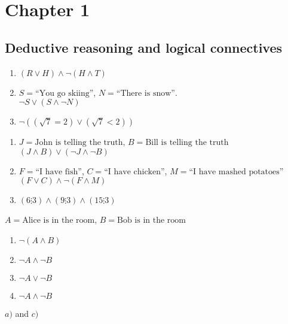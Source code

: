 \section{Chapter 1}
\subsection{Deductive reasoning and logical connectives}
\begin{exx}
  \begin{enumerate}[label=(\alph*)]
    \item $(R\lor H) \land \lnot(H \land T)$
    \item $S = \text{``You go skiing''}$, $N = \text{``There is snow''}$.\\
    $\lnot S \lor (S \land \lnot N)$
    \item $\lnot((\sqrt{7}=2)\lor (\sqrt{7}<2))$
  \end{enumerate}
\end{exx}

\begin{exx}
  \begin{enumerate}[label=(\alph*)]
    \item $J=\text{John is telling the truth}$, $B=\text{Bill is telling the truth}$ \\
    $(J\land B)\lor (\lnot J \land \lnot B)$
    \item $F=\text{``I have fish''}$, $C=\text{``I have chicken''}$, $M=\text{``I have mashed potatoes''}$ \\
    $(F \lor C) \land \lnot(F \land M)$
    \item $(6 \vdots 3) \land (9\vdots 3) \land (15 \vdots 3)$
  \end{enumerate}
\end{exx}

\begin{exx}
  $A=\text{Alice is in the room}$, $B=\text{Bob is in the room}$
  \begin{enumerate}[label=(\alph*)]
    \item $\lnot(A \land B)$
    \item $\lnot A \land \lnot B$
    \item $\lnot A \lor \lnot B$
    \item $\lnot A \land \lnot B$
  \end{enumerate}
\end{exx}

\begin{exx}
  $a)$ and $c)$
\end{exx}

